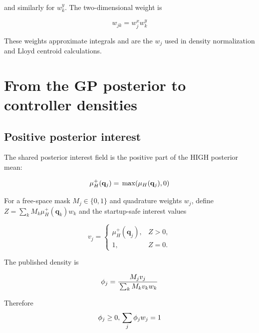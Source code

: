 \documentclass[11pt]{article}
\begin{document}
and similarly for $w^y_k$. The two-dimensional weight is


\begin{equation}
w_{jk}=w^x_jw^y_k
\end{equation}


These weights approximate integrals and are the $w_j$ used in density normalization and Lloyd centroid calculations.


\section{From the GP posterior to controller densities}


\subsection{Positive posterior interest}


The shared posterior interest field is the positive part of the HIGH posterior mean:


\begin{equation}
\mu_H^+(\mathbf q_j) \\
= \\
\max\!\left(\mu_H(\mathbf q_j),0\right)
\end{equation}


For a free-space mask $M_j\in\{0,1\}$ and quadrature weights $w_j$, define
$Z=\sum_k M_k\mu_H^+(\mathbf q_k)w_k$ and the startup-safe interest values


\begin{equation}
v_j
=
\begin{cases}
\mu_H^+(\mathbf q_j), & Z>0,\\
1, & Z=0.
\end{cases}
\end{equation}


The published density is


\begin{equation}
\phi_j \\
= \\
\frac{ \\
M_jv_j \\
}{ \\
\sum_k M_kv_kw_k \\
}
\end{equation}


Therefore
\begin{equation}
\phi_j\ge 0, \\
\qquad \\
\sum_j\phi_jw_j=1
\end{equation}
\end{document}
